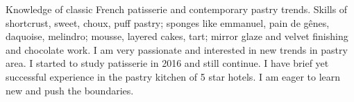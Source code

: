 

\begin{cvparagraph}

Knowledge of classic French patisserie and contemporary pastry trends. Skills of shortcrust, sweet, choux, puff pastry; sponges like emmanuel, pain de gênes, daquoise, melindro; mousse, layered cakes, tart; mirror glaze and velvet finishing and chocolate work. I am very passionate and interested in new trends in pastry area. I started to study patisserie in 2016 and still continue. I have brief yet successful experience in the pastry kitchen of 5 star hotels. I am eager to learn new and push the boundaries.
\end{cvparagraph}
